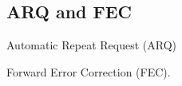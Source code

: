 \documentclass[../../main.tex]{subfiles}
\begin{document}
\subsection{ARQ and FEC}
\begin{definition}
    Automatic Repeat Request (ARQ)
\end{definition}

\begin{definition}
    Forward Error Correction (FEC).
\end{definition}
\end{document}
